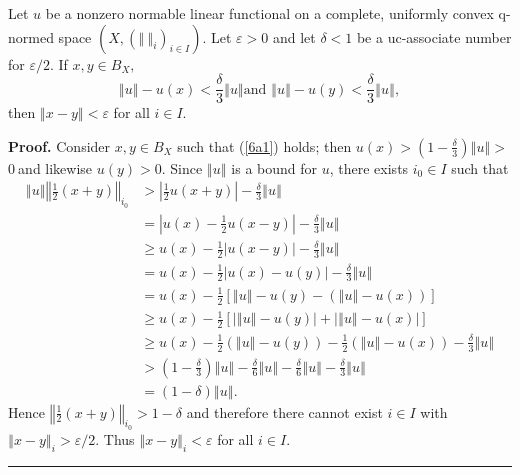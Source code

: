 \documentclass[10pt,a4paper]{amsart}
\newenvironment{proof}[1][Proof]{\noindent\textbf{#1.} }{\ \rule{0.5em}{0.5em}}
\begin{document}
\begin{proposition}
\label{feb28p2}Let $u$ be a nonzero normable linear functional on a complete,
uniformly convex q-normed space $\left(  X,\left(  \left\Vert \ \right\Vert
_{i}\right)  _{i\in I}\right)  $. Let $\varepsilon>0$ and let $\delta<1$ be a
uc-associate number for $\varepsilon/2$. If $x,y\in B_{X},$%
\begin{equation}
\left\Vert u\right\Vert -u(x)<\frac{\delta}{3}\left\Vert u\right\Vert \text{
and }\left\Vert u\right\Vert -u(y)<\frac{\delta}{3}\left\Vert u\right\Vert ,
\label{6a1}%
\end{equation}
then $\left\Vert x-y\right\Vert <\varepsilon$ for all $i\in I$.
\end{proposition}

\begin{proof}
Consider $x,y\in B_{X}$ such that (\ref{6a1}) holds; then $u(x)>\left(
1-\frac{\delta}{3}\right)  \left\Vert u\right\Vert >$ $0\ $and likewise
$u(y)>0$. Since $\left\Vert u\right\Vert $ is a bound for $u$, there exists
$i_{0}\in I$ such that%
\begin{align*}
\left\Vert u\right\Vert \left\Vert \frac{1}{2}\left(  x+y\right)  \right\Vert
_{i_{0}} &  >\left\vert \frac{1}{2}u(x+y)\right\vert -\frac{\delta}%
{3}\left\Vert u\right\Vert \\
&  =\left\vert u(x)-\frac{1}{2}u(x-y)\right\vert -\frac{\delta}{3}\left\Vert
u\right\Vert \\
&  \geq u(x)-\frac{1}{2}\left\vert u(x-y)\right\vert -\frac{\delta}%
{3}\left\Vert u\right\Vert \\
&  =u(x)-\frac{1}{2}\left\vert u(x)-u(y)\right\vert -\frac{\delta}%
{3}\left\Vert u\right\Vert \\
&  =u(x)-\frac{1}{2}\left[  \left\Vert u\right\Vert -u(y)-\left(  \left\Vert
u\right\Vert -u(x)\right)  \right]  \\
&  \geq u(x)-\frac{1}{2}\left[  \left\vert \left\Vert u\right\Vert
-u(y)\right\vert +\left\vert \left\Vert u\right\Vert -u(x)\right\vert \right]
\\
&  \geq u(x)-\frac{1}{2}(\left\Vert u\right\Vert -u(y))-\frac{1}{2}\left(
\left\Vert u\right\Vert -u(x)\right)  -\frac{\delta}{3}\left\Vert u\right\Vert
\\
&  >\left(  1-\frac{\delta}{3}\right)  \left\Vert u\right\Vert -\frac{\delta
}{6}\left\Vert u\right\Vert -\frac{\delta}{6}\left\Vert u\right\Vert
-\frac{\delta}{3}\left\Vert u\right\Vert \\
&  =\left(  1-\delta\right)  \left\Vert u\right\Vert .\text{ }%
\end{align*}
Hence $\left\Vert \frac{1}{2}(x+y)\right\Vert _{i_{0}}>1-\delta$ and therefore
there cannot exist $i\in I$ with $\left\Vert x-y\right\Vert _{i}%
>\varepsilon/2$. Thus $\left\Vert x-y\right\Vert _{i}<\varepsilon$ for all
$i\in I$.
\end{proof}
\end{document}
